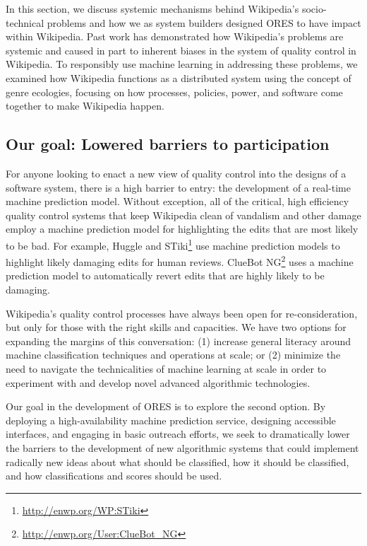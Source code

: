 In this section, we discuss systemic mechanisms behind Wikipedia's socio-technical problems and how we as system builders designed ORES to have impact within Wikipedia.  Past work has demonstrated how Wikipedia's problems are systemic and caused in part to inherent biases in the system of quality control in Wikipedia. To responsibly use machine learning in addressing these problems, we examined how Wikipedia functions as a distributed system using the concept of genre ecologies, focusing on how processes, policies, power, and software come together to make Wikipedia happen.

\subsection{Our goal: Lowered barriers to participation}
For anyone looking to enact a new view of quality control into the designs of a software system, there is a high barrier to entry: the development of a real-time machine prediction model.  Without exception, all of the critical, high efficiency quality control systems that keep Wikipedia clean of vandalism and other damage employ a machine prediction model for highlighting the edits that are most likely to be bad. For example, Huggle and STiki\footnote{\url{http://enwp.org/WP:STiki}} use machine prediction models to highlight likely damaging edits for human reviews.  ClueBot NG\footnote{\url{http://enwp.org/User:ClueBot_NG}} uses a machine prediction model to automatically revert edits that are highly likely to be damaging.

Wikipedia's quality control processes have always been open for re-consideration, but only for those with the right skills and capacities. We have two options for expanding the margins of this conversation\cite{mugar2017preserving}: (1) increase general literacy around machine classification techniques and operations at scale; or (2) minimize the need to navigate the technicalities of machine learning at scale in order to experiment with and develop novel advanced algorithmic technologies.

Our goal in the development of ORES is to explore the second option.  By deploying a high-availability machine prediction service, designing accessible interfaces, and engaging in basic outreach efforts, we seek to dramatically lower the barriers to the development of new algorithmic systems that could implement radically new ideas about what should be classified, how it should be classified, and how classifications and scores should be used.

